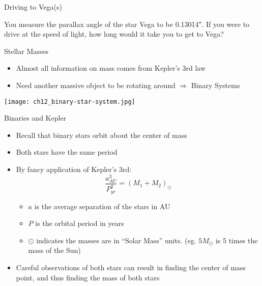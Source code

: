 \documentclass[pdf,aspectratio=169]{beamer}
\begin{document}
\begin{frame}{Driving to Vega(s)}
  \begin{example}
	You measure the parallax angle of the star Vega to be \ang{;;0.13014}. If you were to drive at the speed of light, how long would it take you to get to Vega?
  \end{example}
\end{frame}

\begin{frame}{Stellar Masses}
  \begin{itemize}
	\item Almost all information on mass comes from Kepler's 3rd law
	\item Need another massive object to be rotating around $\Rightarrow$ Binary Systems
  \end{itemize}
  \begin{center}
	\texttt{[image: ch12\_binary-star-system.jpg]}
  \end{center}
\end{frame}

\begin{frame}{Binaries and Kepler}
  \begin{itemize}
	\item Recall that binary stars orbit about the center of mass
	\item Both stars have the same period
	\item By fancy application of Kepler's 3rd:
	  \[\frac{a_{AU}^3}{P_{yr}^2} = (M_1 + M_2)_{\odot}\]
	  \begin{itemize}
		\item $a$ is the average separation of the stars in AU
		\item $P$ is the orbital period in years
		\item $\odot$ indicates the masses are in ``Solar Mass'' units. (eg. $5M_{\odot}$ is 5 times the mass of the Sun)
	  \end{itemize}
	\item Careful observations of both stars can result in finding the center of mass point, and thus finding the mass of both stars
  \end{itemize}
\end{frame}
\end{document}
